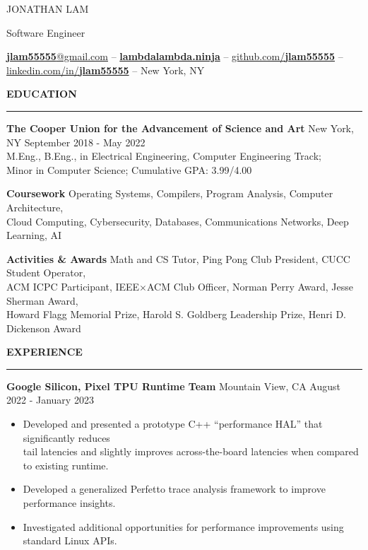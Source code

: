 \documentclass[]{article}
\newcommand{\br}{\vspace{10pt}}
\newcommand{\brs}{\vspace{3pt}}
\newcommand{\hr}{\vspace{4pt}\hrule\vspace{4pt}}
\begin{document}
\thispagestyle{empty}

{\LARGE JONATHAN LAM}

Software Engineer

\href{mailto:jlam55555@gmail.com}{\textbf{jlam55555}@gmail.com} --
\href{https://lambdalambda.ninja}{\textbf{lambdalambda.ninja}} --
\href{https://github.com/jlam55555}{github.com/\textbf{jlam55555}} --
\href{https://linkedin.com/in/jonlamdev}{linkedin.com/in/\textbf{jlam55555}} --
New York, NY

\br
\textbf{EDUCATION}
\hr
\textbf{The Cooper Union for the Advancement of Science and Art}
New York, NY
\hfill
September 2018 - May 2022\\
M.Eng., B.Eng., in Electrical Engineering, Computer Engineering Track;\\
Minor in Computer Science; Cumulative GPA: 3.99/4.00

\brs

\textbf{Coursework} Operating Systems, Compilers, Program Analysis, Computer
Architecture,\\
Cloud Computing, Cybersecurity, Databases, Communications Networks, Deep Learning, AI

\brs

\textbf{Activities \& Awards} Math and CS Tutor, Ping Pong Club President, CUCC
Student Operator, \\ ACM ICPC Participant, IEEE$\times$ACM Club Officer, Norman
Perry Award, Jesse Sherman Award, \\ Howard Flagg Memorial Prize, Harold S. Goldberg
Leadership Prize, Henri D. Dickenson Award

\br

\textbf{EXPERIENCE}
\hr

\textbf{Google Silicon, Pixel TPU Runtime Team}
Mountain View, CA
\hfill
August 2022 - January 2023
\begin{itemize}
\item Developed and presented a prototype C++ ``performance HAL'' that significantly reduces \\
  tail latencies and slightly improves across-the-board latencies when compared to existing runtime.
\item Developed a generalized Perfetto trace analysis framework to improve performance insights.
\item Investigated additional opportunities for performance improvements using standard Linux APIs.
\end{itemize}
\end{document}
